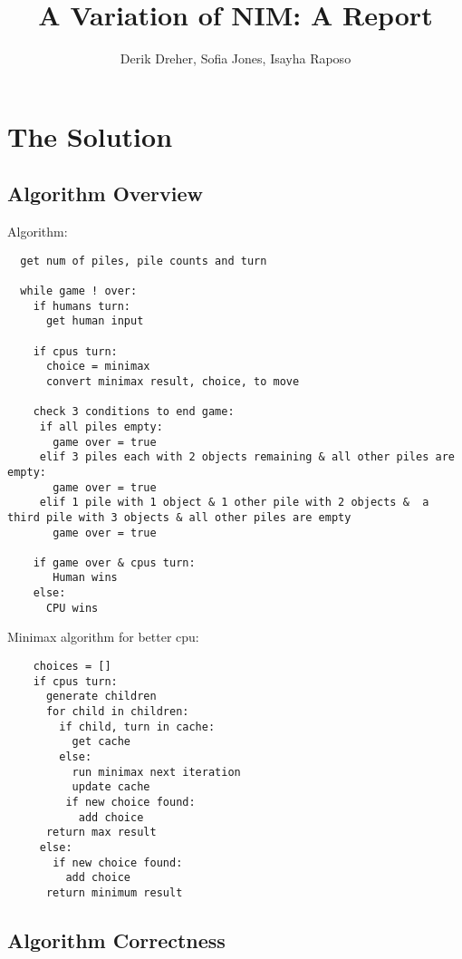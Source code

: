 \documentclass{article}
\begin{document}
\begin{titlepage}
\title{A Variation of NIM: A Report}
\author{Derik Dreher, Sofia Jones, Isayha Raposo}
\maketitle
\thispagestyle{empty}
\end{titlepage}

\rhead{\today}

\section*{The Solution}
\subsection*{Algorithm Overview}

Algorithm:
\begin{verbatim}
  get num of piles, pile counts and turn
  
  while game ! over:
    if humans turn:
      get human input
      
    if cpus turn: 
      choice = minimax
      convert minimax result, choice, to move 
      
    check 3 conditions to end game:
     if all piles empty:
       game over = true
     elif 3 piles each with 2 objects remaining & all other piles are empty:
       game over = true
     elif 1 pile with 1 object & 1 other pile with 2 objects &  a third pile with 3 objects & all other piles are empty
       game over = true
       
    if game over & cpus turn:
       Human wins
    else:
      CPU wins
\end{verbatim}

Minimax algorithm for better cpu:
\begin{verbatim}
    choices = []
    if cpus turn: 
      generate children
      for child in children:
        if child, turn in cache:
          get cache
        else: 
          run minimax next iteration
          update cache
         if new choice found:
           add choice
      return max result
     else:
       if new choice found:
         add choice
      return minimum result
\end{verbatim}


\subsection*{Algorithm Correctness}
\end{document}
